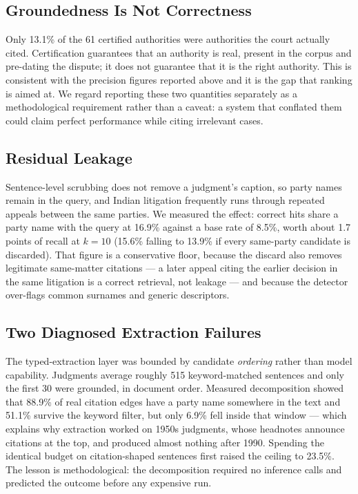 \documentclass[10pt,conference]{IEEEtran}
\begin{document}
\subsection{Groundedness Is Not Correctness}

Only 13.1\% of the 61 certified authorities were authorities the court actually cited.
Certification guarantees that an authority is real, present in the corpus and pre-dating the
dispute; it does not guarantee that it is the right authority. This is consistent with the
precision figures reported above and it is the gap that ranking is aimed at. We
regard reporting these two quantities separately as a methodological requirement rather than
a caveat: a system that conflated them could claim perfect performance while citing
irrelevant cases.

\subsection{Residual Leakage}
\label{sec:leak}

Sentence-level scrubbing does not remove a judgment's caption, so party names remain in the
query, and Indian litigation frequently runs through repeated appeals between the same
parties. We measured the effect: correct hits share a party name with the query at 16.9\%
against a base rate of 8.5\%, worth about 1.7 points of recall at $k{=}10$ (15.6\% falling to
13.9\% if every same-party candidate is discarded). That figure is a conservative floor,
because the discard also removes legitimate same-matter citations --- a later appeal citing
the earlier decision in the same litigation is a correct retrieval, not leakage --- and
because the detector over-flags common surnames and generic descriptors.

\subsection{Two Diagnosed Extraction Failures}
\label{sec:extraction}

The typed-extraction layer was bounded by candidate \emph{ordering} rather than model
capability. Judgments average roughly 515 keyword-matched sentences and only the first 30
were grounded, in document order. Measured decomposition showed that 88.9\% of real citation
edges have a party name somewhere in the text and 51.1\% survive the keyword filter, but only
6.9\% fell inside that window --- which explains why extraction worked on 1950s judgments,
whose headnotes announce citations at the top, and produced almost nothing after 1990.
Spending the identical budget on citation-shaped sentences first raised the ceiling to
23.5\%. The lesson is methodological: the decomposition required no inference calls and
predicted the outcome before any expensive run.
\end{document}
